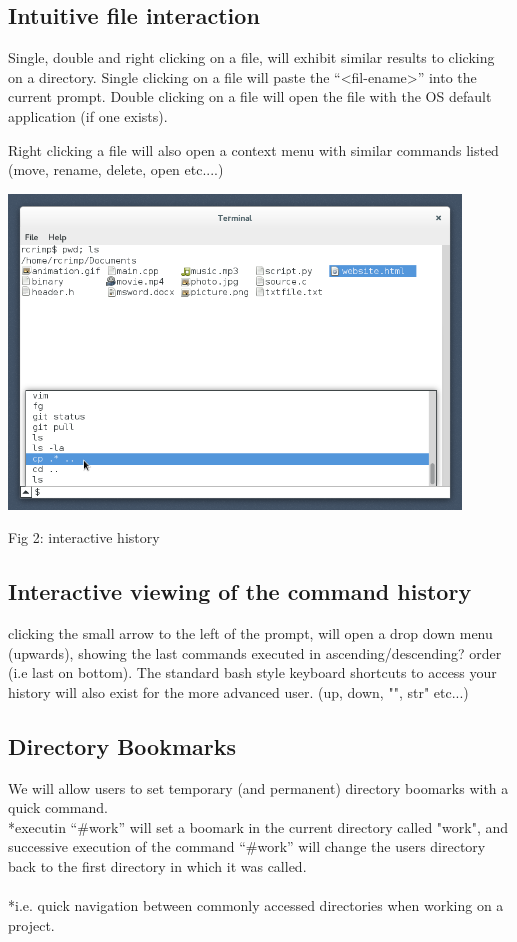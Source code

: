 \documentclass[a4paper,11pt]{article}
\begin{document}
\subsection*{Intuitive file interaction}
Single, double and right clicking on a file, will exhibit similar results to clicking on a directory.
Single clicking on a file will paste the ``\textless fil-ename\textgreater'' into the current prompt.
Double clicking on a file will open the file with the OS default application (if one exists).

Right clicking a file will also  open a context menu with similar commands listed (move, rename, delete, open etc....)


\begin{center}\includegraphics[width=12cm]{history.png}

Fig 2: interactive history\end{center}

\subsection*{Interactive viewing of the command history}
clicking the small arrow to the left of the prompt, will open a drop down menu (upwards), showing the last commands executed in ascending/descending? order (i.e last on bottom). The standard bash style keyboard shortcuts to access your history will also exist for the
more advanced user. (up, down, "", str" etc...)

\subsection*{Directory Bookmarks}
We will allow users to set temporary (and permanent) directory boomarks with a quick command.
\\*executin ``\#work'' will set a boomark in the current directory called "work", and successive execution of the command ``\#work'' will change the users directory back to the first directory in which it was called.
\\\\*i.e. quick navigation between commonly accessed directories when working on a project.
\end{document}
